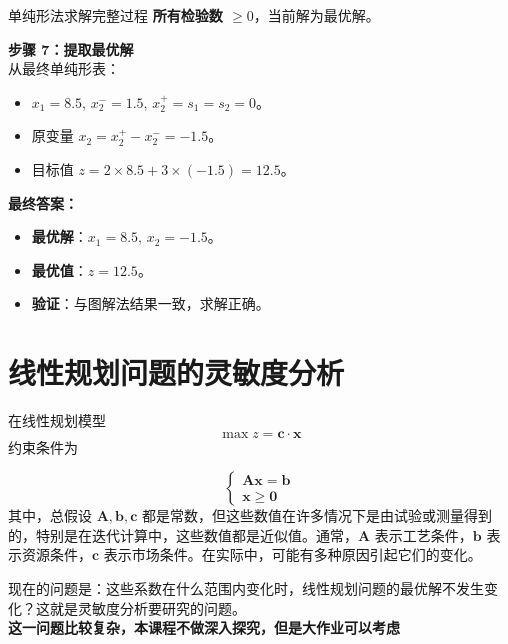\begin{exbox}{单纯形法求解完整过程}
        \textbf{所有检验数 \( \geq 0 \)}，当前解为最优解。
        
        \medskip
        
        \textbf{步骤 7：提取最优解}\\
        从最终单纯形表：
        \begin{itemize}
          \item \( x_1 = 8.5 \), \( x_2^- = 1.5 \), \( x_2^+ = s_1 = s_2 = 0 \)。
          \item 原变量 \( x_2 = x_2^+ - x_2^- = -1.5 \)。
          \item 目标值 \( z = 2 \times 8.5 + 3 \times (-1.5) = 12.5 \)。
        \end{itemize}
        
        \medskip
        
        \textbf{最终答案：}
        \begin{itemize}
          \item \textbf{最优解}：\( x_1 = 8.5 \), \( x_2 = -1.5 \)。
          \item \textbf{最优值}：\( z = 12.5 \)。  
          \item \textbf{验证}：与图解法结果一致，求解正确。
        \end{itemize}
    \end{exbox}

    \section{线性规划问题的灵敏度分析}
    在线性规划模型
    \[
    \max z = \mathbf{c} \cdot \mathbf{x}
    \]
    约束条件为

    \[
    \left\{
    \begin{array}{l}
    \mathbf{A} \mathbf{x} = \mathbf{b} \\
    \mathbf{x} \geq \mathbf{0}
    \end{array}
    \right.
    \]
    其中，总假设 \( \mathbf{A}, \mathbf{b}, \mathbf{c} \) 都是常数，但这些数值在许多情况下是由试验或测量得到的，特别是在迭代计算中，这些数值都是近似值。通常，\( \mathbf{A} \) 表示工艺条件，\( \mathbf{b} \) 表示资源条件，\( \mathbf{c} \) 表示市场条件。在实际中，可能有多种原因引起它们的变化。

    现在的问题是：这些系数在什么范围内变化时，线性规划问题的最优解不发生变化？这就是灵敏度分析要研究的问题。\\
    \textbf{这一问题比较复杂，本课程不做深入探究，但是大作业可以考虑}



